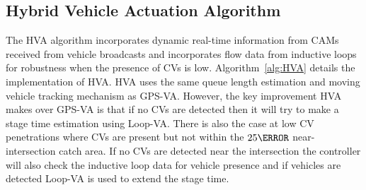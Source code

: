 \documentclass[numbered]{trbunofficial}
\begin{document}
\subsection{Hybrid Vehicle Actuation Algorithm}\label{sec:hva}
The HVA algorithm incorporates dynamic real-time information from CAMs received from vehicle broadcasts and incorporates flow data from inductive loops for robustness when the presence of CVs is low. Algorithm~\ref{alg:HVA} details the implementation of HVA. HVA uses the same queue length estimation and moving vehicle tracking mechanism as GPS-VA. However, the key improvement  HVA makes over GPS-VA is that if no CVs are detected then it will try to make a stage time estimation using Loop-VA. There is also the case at low CV penetrations where CVs are present but not within the $25\m$ near-intersection catch area. If no CVs are detected near the intersection the controller will also check the inductive loop data for vehicle presence and if vehicles are detected Loop-VA is used to extend the stage time.
\end{document}

